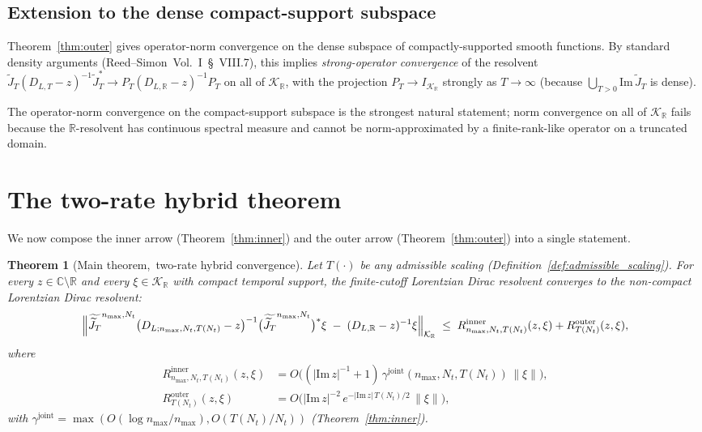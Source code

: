 \documentclass[11pt,a4paper]{article}
\theoremstyle{plain}
\newtheorem{theorem}{Theorem}[section]
\theoremstyle{definition}
\newcommand{\nmax}{n_{\max}}
\newcommand{\Nt}{N_{t}}
\newcommand{\Krein}{\mathcal{K}}
\newcommand{\norm}[1]{\lVert #1 \rVert}
\newcommand{\R}{\mathbb{R}}
\newcommand{\C}{\mathbb{C}}
\newcommand{\DLR}{D_{L,\R}}
\newcommand{\DLT}{D_{L,T}}
\newcommand{\JT}{\widetilde{J}_{T}}
\newcommand{\gammajoint}{\gamma^{\mathrm{joint}}}
\begin{document}
\subsection{Extension to the dense compact-support subspace}
\label{sec:outer_extension}

Theorem~\ref{thm:outer} gives operator-norm convergence on the dense
subspace of compactly-supported smooth functions. By standard density
arguments (Reed--Simon~Vol.~I~\S~VIII.7), this implies
\emph{strong-operator convergence} of the resolvent
$\JT (\DLT - z)^{-1} \JT^{*} \to P_{T}(\DLR - z)^{-1} P_{T}$ on all of
$\Krein_{\R}$, with the projection $P_{T} \to I_{\Krein_{\R}}$
strongly as $T \to \infty$ (because
$\bigcup_{T > 0} \mathrm{Im}\,\JT$ is dense).

The operator-norm convergence on the compact-support subspace is the
strongest natural statement; norm convergence on all of $\Krein_{\R}$
fails because the $\R$-resolvent has continuous spectral measure and
cannot be norm-approximated by a finite-rank-like operator on a
truncated domain.

\section{The two-rate hybrid theorem}\label{sec:composite}

We now compose the inner arrow (Theorem~\ref{thm:inner}) and the outer
arrow (Theorem~\ref{thm:outer}) into a single statement.

\begin{theorem}[Main theorem,\ two-rate hybrid
convergence]\label{thm:main}
Let $T(\cdot)$ be any admissible scaling
(Definition~\ref{def:admissible_scaling}). For every $z \in \C
\setminus \R$ and every $\xi \in \Krein_{\R}$ with compact temporal
support, the finite-cutoff Lorentzian Dirac resolvent converges to the
non-compact Lorentzian Dirac resolvent:
\begin{equation}\label{eq:main_bound}
\Bigl\| \widetilde{\JT}^{\nmax, \Nt} \bigl(D_{L;\nmax,\Nt,T(\Nt)}
- z\bigr)^{-1}
\bigl(\widetilde{\JT}^{\nmax, \Nt}\bigr)^{*} \xi
\;-\; (\DLR - z)^{-1} \xi \Bigr\|_{\Krein_{\R}}
\;\le\; R^{\mathrm{inner}}_{\nmax, \Nt, T(\Nt)} (z, \xi) +
R^{\mathrm{outer}}_{T(\Nt)} (z, \xi),
\end{equation}
where
\begin{align}
R^{\mathrm{inner}}_{\nmax, \Nt, T(\Nt)}(z, \xi)
&= O\bigl((|\mathrm{Im}\,z|^{-1} + 1) \,
\gammajoint(\nmax, \Nt, T(\Nt)) \,\norm{\xi}\bigr),
\label{eq:main_inner}\\
R^{\mathrm{outer}}_{T(\Nt)}(z, \xi)
&= O\bigl(|\mathrm{Im}\,z|^{-2}\,e^{-|\mathrm{Im}\,z|\,T(\Nt)/2}\,
\norm{\xi}\bigr),
\label{eq:main_outer}
\end{align}
with $\gammajoint = \max(O(\log\nmax/\nmax), O(T(\Nt)/\Nt))$
(Theorem~\ref{thm:inner}).
\end{theorem}
\end{document}
